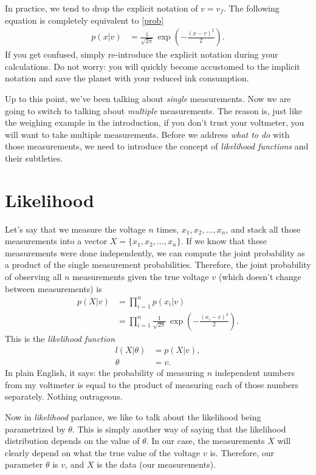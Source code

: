 \documentclass[10pt]{article}
\begin{document}
In practice, we tend to drop the explicit notation of $v=v_f$. The following equation is completely equivalent to \cref{prob}
\begin{align}
	p(x \vert v) &= \frac{1}{\sqrt{2\pi}}\,\exp\left( -\frac{(x-v)^2}{2} \right).
\end{align}
If you get confused, simply re-introduce the explicit notation during your calculations. Do not worry: you will quickly become accustomed to the implicit notation and save the planet with your reduced ink consumption.

Up to this point, we've been talking about \emph{single} measurements. Now we are going to switch to talking about \emph{multiple} measurements. The reason is, just like the weighing example in the introduction, if you don't trust your voltmeter, you will want to take multiple measurements. Before we address \emph{what to do} with those measurements, we need to introduce the concept of \emph{likelihood functions} and their subtleties.

\section{Likelihood}

Let's say that we measure the voltage $n$ times, $x_1, x_2, \ldots, x_n$, and stack all those measurements into a vector $X = \{x_1, x_2, \ldots, x_n\}$. If we know that these measurements were done independently, we can compute the joint probability as a product of the single measurement probabilities. Therefore, the joint probability of observing all $n$ measurements given the true voltage $v$ (which doesn't change between measurements) is
\begin{align}
	p(X\vert v) &= \prod_{i=1}^n p(x_i|v)\\
				&= \prod_{i=1}^n \frac{1}{\sqrt{2\pi}}\,\exp\left( -\frac{(x_i-v)^2}{2} \right).\label{likelihood}
\end{align}
This is the \emph{likelihood function}
\begin{align}
	l(X \vert \theta) &= p(X \vert v),\\
	\theta &= v.
\end{align}
In plain English, it says: the probability of measuring $n$ independent numbers from my voltmeter is equal to the product of measuring each of those numbers separately. Nothing outrageous.

Now in \emph{likelihood} parlance, we like to talk about the likelihood being parametrized by $\theta$. This is simply another way of saying that the likelihood distribution depends on the value of $\theta$. In our case, the measurements $X$ will clearly depend on what the true value of the voltage $v$ is. Therefore, our parameter $\theta$ is $v$, and $X$ is the data (our measurements).
\end{document}
